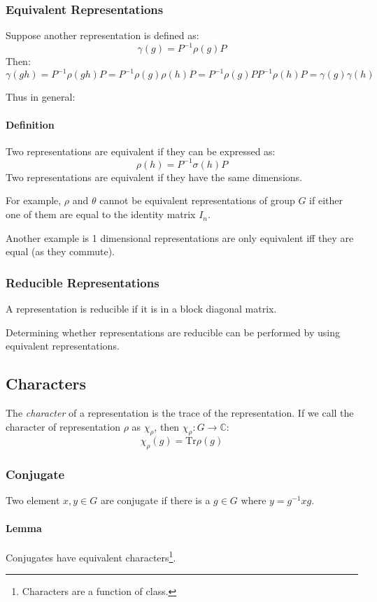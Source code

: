 \documentclass[12pt]{article}
\begin{document}
\subsubsection{Equivalent Representations}
Suppose another representation is defined as:
\[\gamma(g) = P^{-1}\rho(g)P\]
Then:
\[\gamma(gh) = P^{-1}\rho(gh)P = P^{-1}\rho(g)\rho(h)P = P^{-1}\rho(g)PP^{-1}\rho(h)P = \gamma(g)\gamma(h)\]

Thus in general:
\paragraph{Definition}
Two representations are equivalent if they can be expressed as:
\[\rho(h) = P^{-1}\sigma(h)P\]
Two representations are equivalent if they have the same dimensions.

For example, $\rho$ and $\theta$ cannot be equivalent representations of group $G$ if either one of them are equal to the identity matrix $I_n$.

Another example is 1 dimensional representations are only equivalent iff they are equal (as they commute).

\subsubsection{Reducible Representations}
A representation is reducible if it is in a block diagonal matrix. 

Determining whether representations are reducible can be performed by using equivalent representations.

\subsection{Characters}
The \textit{character} of a representation is the trace of the representation. If we call the character of representation $\rho$ as $\chi_\rho$, then $\chi_\rho:G\to \mathbb{C}$:
\[ \chi_\rho(g) = \text{Tr}\rho(g)\]

\subsubsection{Conjugate}
Two element \(x,y \in G\) are conjugate if there is a \(g \in G\) where \(y = g^{-1}x g\).

\paragraph{Lemma} Conjugates have equivalent characters\footnote{Characters are a function of class.}.
\end{document}

